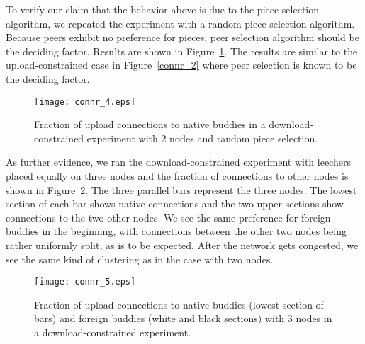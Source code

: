 \documentclass[10pt,letterpaper,twocolumn]{article}
\begin{document}
To verify our claim that the behavior above is due to the piece
selection algorithm, we repeated the experiment with a random piece
selection algorithm. Because peers exhibit no preference for pieces,
peer selection algorithm should be the deciding factor. Results are
shown in Figure~\ref{connr_4}. The results are similar to the
upload-constrained case in Figure~\ref{connr_2} where peer selection
is known to be the deciding factor.







\begin{figure}[!tb]
\begin{center}
\texttt{[image: connr\_4.eps]}
\caption{Fraction of upload connections to native buddies in a
  download-constrained experiment with 2 nodes and random piece selection.}
\label{connr_4}
\end{center}
\end{figure}








As further evidence, we ran the download-constrained experiment with
leechers placed equally on three nodes and the fraction of connections
to other nodes is shown in Figure~\ref{connr_5}. The three parallel
bars represent the three nodes. The lowest section of each bar shows
native connections and the two upper sections show connections to the
two other nodes. We see the same preference for foreign buddies in the
beginning, with connections between the other two nodes being rather
uniformly split, as is to be expected. After the network gets
congested, we see the same kind of clustering as in the case with two
nodes. 

\begin{figure}[!tb]
  \begin{center}
    \texttt{[image: connr\_5.eps]}
    \caption{Fraction of upload connections to native buddies (lowest
      section of bars) and foreign buddies (white and black sections)
      with 3 nodes in a download-constrained experiment.}
    \label{connr_5}
  \end{center}
\end{figure}
\end{document}
